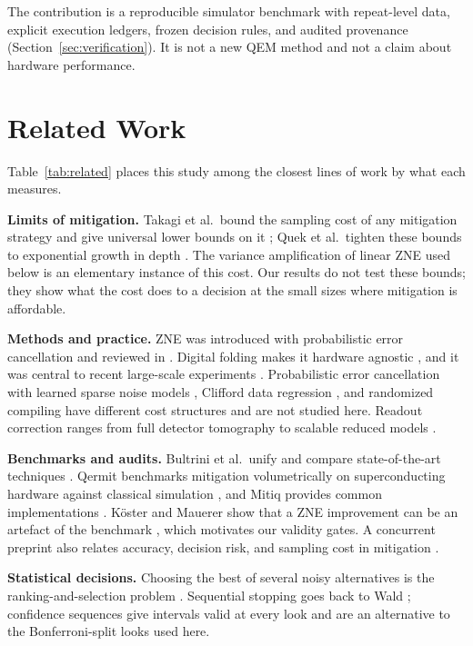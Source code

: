 \documentclass[10pt,twocolumn]{article}
\newcommand{\paragraphlead}[1]{\textbf{#1}\quad}
\begin{document}
The contribution is a reproducible simulator benchmark with repeat-level data, explicit execution
ledgers, frozen decision rules, and audited provenance (Section~\ref{sec:verification}). It is not a
new QEM method and not a claim about hardware performance.

\section{Related Work}
\label{sec:related}
Table~\ref{tab:related} places this study among the closest lines of work by what each measures.

\paragraphlead{Limits of mitigation.}
Takagi et al.\ bound the sampling cost of any mitigation strategy \cite{takagi2022} and give universal
lower bounds on it \cite{takagi2023}; Quek et al.\ tighten these bounds to exponential growth in
depth \cite{quek2024}. The variance amplification of linear ZNE used below is an elementary instance
of this cost. Our results do not test these bounds; they show what the cost does to a decision at the
small sizes where mitigation is affordable.

\paragraphlead{Methods and practice.}
ZNE was introduced with probabilistic error cancellation \cite{temme2017,li2017} and reviewed in
\cite{endo2018,cai2023}. Digital folding makes it hardware agnostic \cite{giurgica2020}, and it was
central to recent large-scale experiments \cite{kandala2019,kim2023}. Probabilistic error cancellation
with learned sparse noise models \cite{vandenberg2023}, Clifford data regression \cite{czarnik2021},
and randomized compiling \cite{wallman2016} have different cost structures and are not studied here.
Readout correction ranges from full detector tomography \cite{maciejewski2020,bravyi2021} to scalable
reduced models \cite{nation2021}.

\paragraphlead{Benchmarks and audits.}
Bultrini et al.\ unify and compare state-of-the-art techniques \cite{bultrini2021}. Qermit benchmarks
mitigation volumetrically on superconducting hardware against classical simulation
\cite{cirstoiu2023}, and Mitiq provides common implementations \cite{larose2022}. K\"oster and
Mauerer show that a ZNE improvement can be an artefact of the benchmark \cite{koster2026}, which
motivates our validity gates. A concurrent preprint also relates accuracy, decision risk, and
sampling cost in mitigation \cite{scavino2026}.

\paragraphlead{Statistical decisions.}
Choosing the best of several noisy alternatives is the ranking-and-selection problem
\cite{bechhofer1954}. Sequential stopping goes back to Wald \cite{wald1945}; confidence sequences
give intervals valid at every look \cite{howard2021} and are an alternative to the Bonferroni-split
looks used here.
\end{document}
